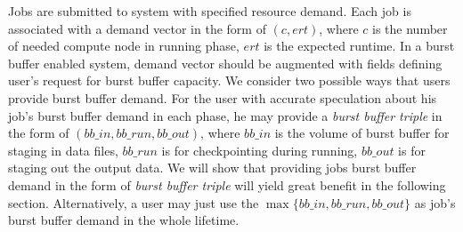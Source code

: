 Jobs are submitted to system with specified resource demand. 
Each job is associated with a demand vector in the form of $(c, ert)$, 
where $c$ is the number of needed compute node in running phase,
$ert$ is the expected runtime. 
In a burst buffer enabled system, demand vector should be augmented
with fields defining user's request for burst buffer capacity.
We consider two possible ways that users provide burst buffer demand.
For the user with accurate speculation about his job's burst buffer demand in each phase,
he may provide a \textit{burst buffer triple} in the form of $(bb\_in, bb\_run, bb\_out)$,
where $bb\_in$ is the volume of burst buffer for staging in data files,
$bb\_run$ is for checkpointing during running,
$bb\_out$ is for staging out the output data.
We will show that providing jobs burst buffer demand in the form of \textit{burst buffer triple} 
will yield great benefit in the following section.
Alternatively, a user may just use the $\max\{bb\_in, bb\_run, bb\_out\}$ 
as job's burst buffer demand in the whole lifetime. 



